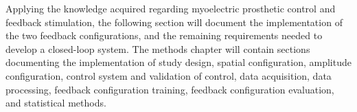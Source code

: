 

Applying the knowledge acquired regarding myoelectric prosthetic control and feedback stimulation, the following section will document the implementation of the two feedback configurations, and the remaining requirements needed to develop a closed-loop system. The methods chapter will contain sections documenting the implementation of study design, spatial configuration, amplitude configuration, control system and validation of control, data acquisition, data processing, feedback configuration training, feedback configuration evaluation, and statistical methods.      